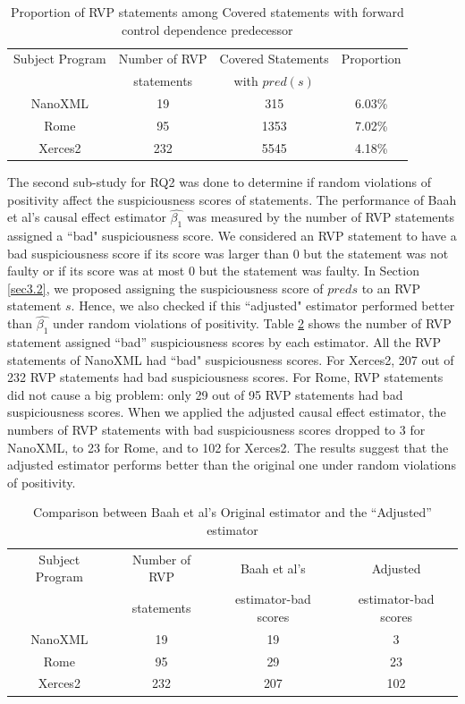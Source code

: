 \begin{table}
\caption{Proportion of RVP statements among Covered statements with forward control dependence predecessor}\label{table2}
\centering
\begin{tabular}{|c|c|c|c|}
\hline
Subject Program	&	Number of RVP	&	Covered Statements	&	Proportion	\\ 
 & statements & with $pred(s)$ &\\\hline
NanoXML	&	19&	315	&	6.03\%	\\ \hline
Rome 	&	95	&	1353	&	7.02\%	\\ \hline
Xerces2 &	232	&	5545	&	4.18\%	\\ \hline

\end{tabular}
\end{table}

The second sub-study for RQ2 was done to determine if random violations of positivity affect the suspiciousness scores of statements.  The performance of Baah et al’s causal effect estimator $\widehat{\beta_1}$ was measured by the number of RVP statements assigned a ``bad" suspiciousness score.  We considered an RVP statement to have a bad suspiciousness score if its score was larger than 0 but the statement was not faulty or if its score was at most 0 but the statement was faulty.  In Section \ref{sec3.2}, we proposed assigning the suspiciousness score of $pred{s}$ to an RVP statement $s$.  Hence, we also checked if this ``adjusted" estimator performed better than $\widehat{\beta_1}$ under random violations of positivity.  Table \ref{table3} shows the number of RVP statement assigned “bad” suspiciousness scores by each estimator.  All the RVP statements of NanoXML had ``bad" suspiciousness scores.  For Xerces2, 207 out of 232 RVP statements had bad suspiciousness scores.  For Rome, RVP statements did not cause a big problem: only 29 out of 95 RVP statements had bad suspiciousness scores.  When we applied the adjusted causal effect estimator, the numbers of RVP statements with bad suspiciousness scores dropped to 3 for NanoXML, to 23 for Rome, and to 102 for Xerces2.  The results suggest that the adjusted estimator performs better than the original one under random violations of positivity.
\begin{table}
\caption{Comparison between Baah et al’s  Original estimator and the ``Adjusted” estimator}\label{table3}
\centering
\begin{tabular}{|c|c|c|c|}
\hline
Subject Program	&	Number of RVP	&	Baah et al’s	&	Adjusted	\\ 
 & statements & estimator-bad scores &estimator-bad scores\\\hline
NanoXML	&	19&	19	&	3	\\ \hline
Rome 	&	95	&	29	&	23	\\ \hline
Xerces2 &	232	&	207	&	102	\\ \hline

\end{tabular}
\end{table}

